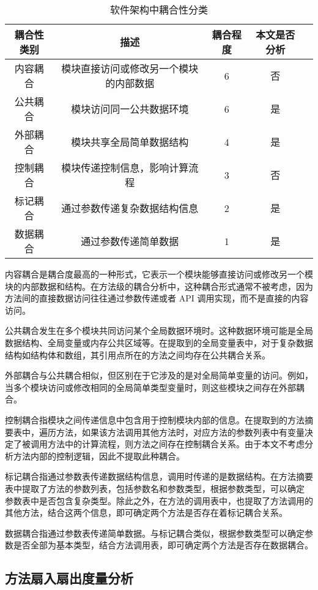 \begin{table}[htbp]
\caption{软件架构中耦合性分类}
\vspace{0.5em}\centering\wuhao
\begin{tabular}{ccccc}
\toprule
耦合性类别 & 描述 & 耦合程度 & 本文是否分析 \\
\midrule
内容耦合 & 模块直接访问或修改另一个模块的内部数据 & 6 & 否\\
公共耦合 & 模块访问同一公共数据环境 & 6 & 是 \\
外部耦合 & 模块共享全局简单数据结构 & 4 & 是 \\
控制耦合 & 模块传递控制信息，影响计算流程 & 3 & 否 \\
标记耦合 & 通过参数传递复杂数据结构信息 & 2 & 是 \\
数据耦合 & 通过参数传递简单数据 & 1 & 是 \\
\bottomrule
\end{tabular}
\end{table}


内容耦合是耦合度最高的一种形式，它表示一个模块能够直接访问或修改另一个模块的内部数据和结构。在方法级的耦合分析中，这种耦合形式通常不被考虑，因为方法间的直接数据访问往往通过参数传递或者 API 调用实现，而不是直接的内容访问。

公共耦合发生在多个模块共同访问某个全局数据环境时。这种数据环境可能是全局数据结构、全局变量或内存公共区域等。在提取到的全局变量表中，对于复杂数据结构如结构体和数组，其引用点所在的方法之间均存在公共耦合关系。


外部耦合与公共耦合相似，但区别在于它涉及的是对全局简单变量的访问。例如，当多个模块访问或修改相同的全局简单类型变量时，则这些模块之间存在外部耦合。


控制耦合指模块之间传递信息中包含用于控制模块内部的信息。在提取到的方法摘
要表中，遍历方法，如果该方法调用其他方法时，对应方法的参数列表中有变量决定了被调用方法中的计算流程，则方法之间存在控制耦合关系。由于本文不考虑分析方法内部的控制逻辑，因此不提取此种耦合。


标记耦合指通过参数表传递数据结构信息，调用时传递的是数据结构。在方法摘要
表中提取了方法的参数列表，包括参数名和参数类型，根据参数类型，可以确定
参数表中是否包含复杂类型。除此之外，在方法的调用表中，也提取了方法调用的
其他方法，结合这两个信息，即可确定两个方法是否存在着标记耦合关系。


数据耦合指通过参数表传递简单数据。与标记耦合类似，根据参数类型可以确定参
数是否全部为基本类型，结合方法调用表，即可确定两个方法是否存在数据耦合。
\subsection{方法扇入扇出度量分析}

